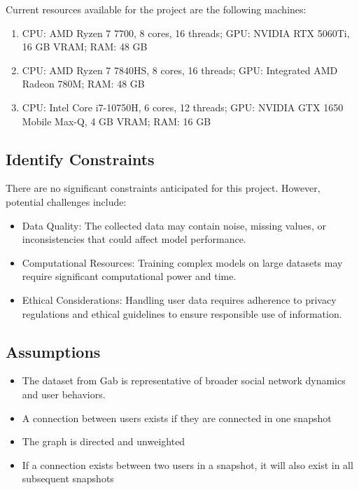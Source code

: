 Current resources available for the project are the following machines:

\begin{enumerate}
	\item CPU: AMD Ryzen 7 7700, 8 cores, 16 threads; GPU: NVIDIA RTX 5060Ti, 16 GB VRAM; RAM: 48 GB
	\item CPU: AMD Ryzen 7 7840HS, 8 cores, 16 threads; GPU: Integrated AMD Radeon 780M; RAM: 48 GB
	\item CPU: Intel Core i7-10750H, 6 cores, 12 threads; GPU: NVIDIA GTX 1650 Mobile Max-Q, 4 GB VRAM; RAM: 16 GB
\end{enumerate}

\subsection*{Identify Constraints}

There are no significant constraints anticipated for this project. However, potential challenges include:

\begin{itemize}
	\item Data Quality: The collected data may contain noise, missing values, or inconsistencies that could affect model performance.
	\item Computational Resources: Training complex models on large datasets may require significant computational power and time.
	\item Ethical Considerations: Handling user data requires adherence to privacy regulations and ethical guidelines to ensure responsible use of information.
\end{itemize}

\subsection*{Assumptions}

\begin{itemize}
	\item The dataset from Gab is representative of broader social network dynamics and user behaviors.
	\item A connection between users exists if they are connected in one snapshot
	\item The graph is directed and unweighted
	\item If a connection exists between two users in a snapshot, it will also exist in all subsequent snapshots
\end{itemize}


